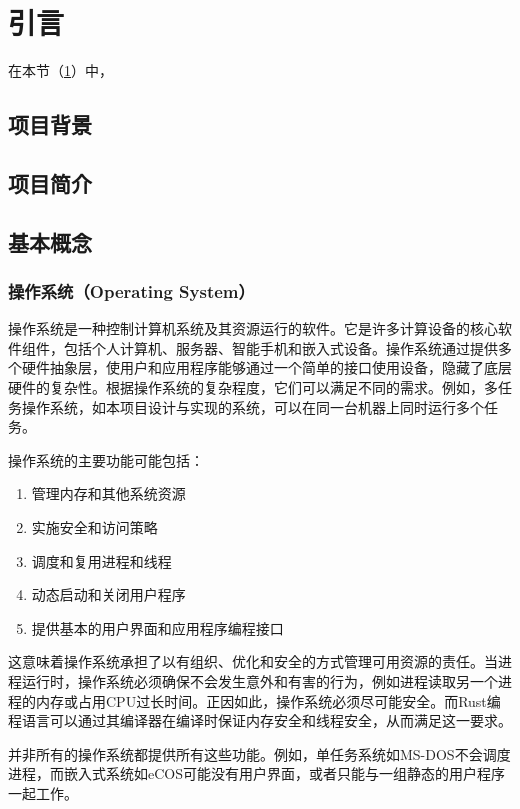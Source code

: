 \section{引言}\label{sec:Introduction}

在本节（\cref{sec:Introduction}）中，

\subsection{项目背景}

\subsection{项目简介}

\subsection{基本概念}

\subsubsection{操作系统（Operating System）}

操作系统是一种控制计算机系统及其资源运行的软件。它是许多计算设备的核心软件组件，包括个人计算机、服务器、智能手机和嵌入式设备。操作系统通过提供多个硬件抽象层，使用户和应用程序能够通过一个简单的接口使用设备，隐藏了底层硬件的复杂性。根据操作系统的复杂程度，它们可以满足不同的需求。例如，多任务操作系统，如本项目设计与实现的系统，可以在同一台机器上同时运行多个任务。

操作系统的主要功能可能包括：

\begin{enumerate}
    \item 管理内存和其他系统资源
    \item 实施安全和访问策略
    \item 调度和复用进程和线程
    \item 动态启动和关闭用户程序
    \item 提供基本的用户界面和应用程序编程接口
\end{enumerate}

这意味着操作系统承担了以有组织、优化和安全的方式管理可用资源的责任。当进程运行时，操作系统必须确保不会发生意外和有害的行为，例如进程读取另一个进程的内存或占用CPU过长时间。正因如此，操作系统必须尽可能安全。而Rust编程语言可以通过其编译器在编译时保证内存安全和线程安全，从而满足这一要求。

并非所有的操作系统都提供所有这些功能。例如，单任务系统如MS-DOS不会调度进程，而嵌入式系统如eCOS可能没有用户界面，或者只能与一组静态的用户程序一起工作。

